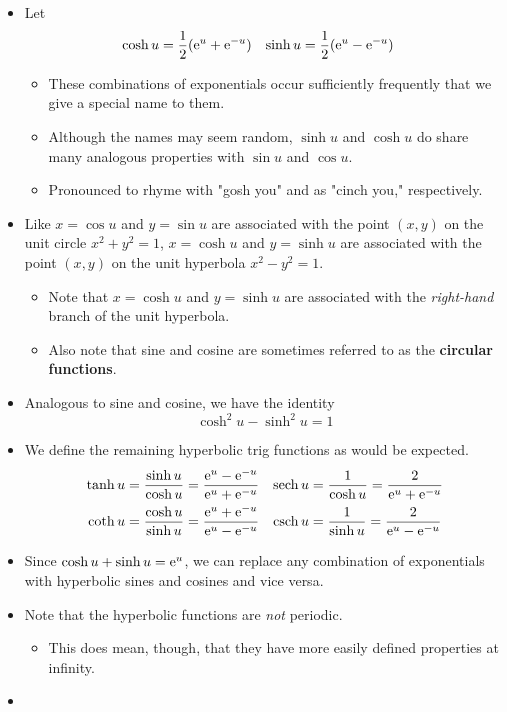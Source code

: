 \documentclass[../main.tex]{subfiles}
\begin{document}
\begin{itemize}
    \item Let
    \begin{align*}
        \cosh u &= \frac{1}{2}(\e[u]+\e[-u])&
        \sinh u &= \frac{1}{2}(\e[u]-\e[-u])
    \end{align*}
    \begin{itemize}
        \item These combinations of exponentials occur sufficiently frequently that we give a special name to them.
        \item Although the names may seem random, $\sinh u$ and $\cosh u$ do share many analogous properties with $\sin u$ and $\cos u$.
        \item Pronounced to rhyme with "gosh you" and as "cinch you," respectively.
    \end{itemize}
    \item Like $x=\cos u$ and $y=\sin u$ are associated with the point $(x,y)$ on the unit circle $x^2+y^2=1$, $x=\cosh u$ and $y=\sinh u$ are associated with the point $(x,y)$ on the unit hyperbola $x^2-y^2=1$.
    \begin{itemize}
        \item Note that $x=\cosh u$ and $y=\sinh u$ are associated with the \emph{right-hand} branch of the unit hyperbola.
        \item Also note that sine and cosine are sometimes referred to as the \textbf{circular functions}.
    \end{itemize}
    \item Analogous to sine and cosine, we have the identity
    \begin{equation*}
        \cosh^2u-\sinh^2u=1
    \end{equation*}
    \item We define the remaining hyperbolic trig functions as would be expected.
    \begin{align*}
        \tanh u &= \frac{\sinh u}{\cosh u} = \frac{\e[u]-\e[-u]}{\e[u]+\e[-u]}&
        \sech u &= \frac{1}{\cosh u} = \frac{2}{\e[u]+\e[-u]}\\
        \coth u &= \frac{\cosh u}{\sinh u} = \frac{\e[u]+\e[-u]}{\e[u]-\e[-u]}&
        \csch u &= \frac{1}{\sinh u} = \frac{2}{\e[u]-\e[-u]}
    \end{align*}
    \item Since $\cosh u+\sinh u=\e[u]$, we can replace any combination of exponentials with hyperbolic sines and cosines and vice versa.
    \item Note that the hyperbolic functions are \emph{not} periodic.
    \begin{itemize}
        \item This does mean, though, that they have more easily defined properties at infinity.
    \end{itemize}
    \item {}
\end{itemize}
\end{document}

